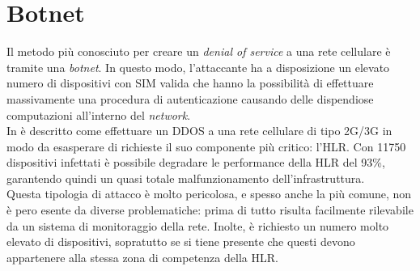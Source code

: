 \section{Botnet}
Il metodo più conosciuto per creare un \textit{denial of service} a una rete cellulare è tramite una \textit{botnet}.
In questo modo, l'attaccante ha a disposizione un elevato numero di dispositivi con SIM valida che hanno la possibilità di effettuare massivamente una procedura
di autenticazione causando delle dispendiose computazioni all'interno del \textit{network}.\\
In \cite{measuring-dos} è descritto come effettuare un DDOS a una rete cellulare di tipo 2G/3G in modo da esasperare di richieste il suo componente più critico: l'HLR.
Con 11750 dispositivi infettati è possibile degradare le performance della HLR del 93\%\cite{measuring-dos}, garantendo quindi un quasi totale malfunzionamento dell'infrastruttura.\\
Questa tipologia di attacco è molto pericolosa, e spesso anche la più comune, non è pero esente da diverse problematiche: prima di tutto risulta facilmente rilevabile da un sistema di 
monitoraggio della rete. Inolte, è richiesto un numero molto elevato di dispositivi, sopratutto se si tiene presente che questi devono 
appartenere alla stessa zona di competenza della HLR.\\

\clearpage

